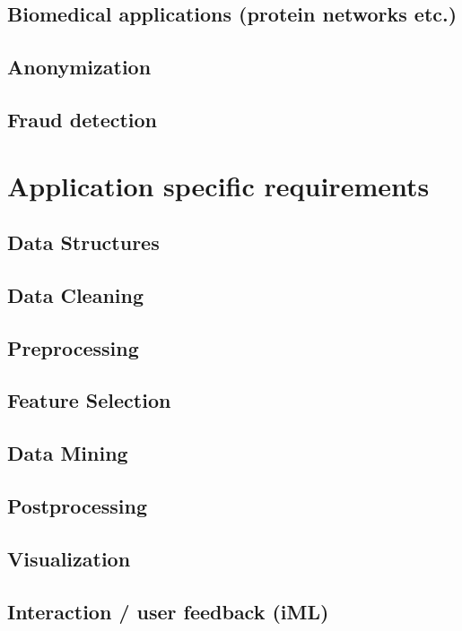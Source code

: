 	\subsection{Biomedical applications (protein networks etc.)}
	\label{ssect:app_biomed}
	
	\subsection{Anonymization}
	\label{ssect:app_snonymization}
	
	\subsection{Fraud detection}
	\label{ssect:fraud_detection}



\section{Application specific requirements}
\label{section:app_requirements}

	\subsection{Data Structures}
	\label{ssect:data_gathering}
	
	\subsection{Data Cleaning}
	\label{ssect:data_cleaning}
	
	\subsection{Preprocessing}
	\label{ssect:preprocessing}
	
	\subsection{Feature Selection}
	\label{ssect:feature_selection}
	
	\subsection{Data Mining}
	\label{ssect:data_mining}
	
	\subsection{Postprocessing}
	\label{ssect:postprocessing}
	
	\subsection{Visualization}
	\label{ssect:visualization}
	
	\subsection{Interaction / user feedback (iML)}
	\label{ssect:interaction}
	